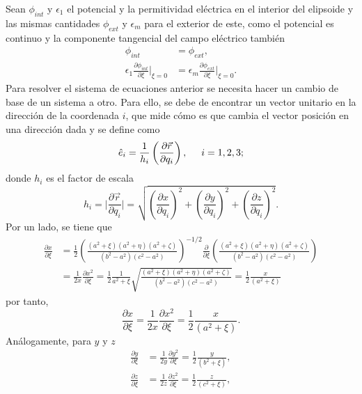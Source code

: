 \documentclass[paper=letter, fontsize=12pt,]{article}
\newcommand{\uvec}[1]{\hat{e}_{#1}}
\begin{document}
Sean $\phi_{int}$ y $\epsilon_1$ el potencial y la permitividad eléctrica en el interior del elipsoide y las mismas cantidades $\phi_{ext}$ y $\epsilon_m$ para el exterior de este, como el potencial es continuo y la componente tangencial del campo eléctrico también
\begin{subequations}
\label{condicionesfrontera}
\begin{align}
    \phi_{int}&=\phi_{ext}\label{cf1},\\
    \epsilon_1\frac{\partial \phi_{int}}{\partial \xi}\Big |_{\xi=0}&=
    \epsilon_m\frac{\partial \phi_{ext}}{\partial \xi}\Big |_{\xi=0}\label{cf2}.
\end{align}
\end{subequations}
Para resolver el sistema de ecuaciones anterior se necesita hacer un cambio de base de un sistema a otro. Para ello, se debe de encontrar un vector unitario en la dirección de la coordenada $i$, que mide cómo es que cambia el vector posición en una dirección dada y se define como \cite{Arfken}
\begin{equation}
    \uvec{i}=\frac{1}{h_i}\left(\frac{\partial \Vec{r}}{\partial q_i}\right), \hspace{0.5cm} i=1,2,3;    
\end{equation}
donde $h_i$ es el factor de escala
\begin{equation}
    h_i=\Big|\frac{\partial \Vec{r}}{\partial q_i}\Big|=\sqrt{\left(\frac{\partial x}{\partial q_i}\right)^2+\left(\frac{\partial y}{\partial q_i}\right)^2+\left(\frac{\partial z}{\partial q_i}\right)^2}.
\end{equation}
Por un lado, se tiene que 
\begin{align*}
  \frac{\partial x}{\partial \xi}&=\frac{1}{2}\left(\frac{(a^2+\xi)(a^2+\eta)(a^2+\zeta)}{(b^2-a^2)(c^2-a^2)}\right)^{-1/2}\frac{\partial}{\partial \xi}\left(\frac{(a^2+\xi)(a^2+\eta)(a^2+\zeta)}{(b^2-a^2)(c^2-a^2)}\right)\nonumber\\
  &=\frac{1}{2x}\frac{\partial x^2}{\partial\xi}=\frac{1}{2}\frac{1}{a^2+\xi}\sqrt{\frac{(a^2+\xi)(a^2+\eta)(a^2+\zeta)}{(b^2-a^2)(c^2-a^2)}}=\frac{1}{2}\frac{x}{(a^2+\xi)}
\end{align*}
por tanto,
\begin{equation}
    \frac{\partial x}{\partial \xi}=\frac{1}{2x}\frac{\partial x^2}{\partial\xi}=\frac{1}{2}\frac{x}{(a^2+\xi)}.
\end{equation}
Análogamente, para $y$ y $z$
\begin{align}
    \frac{\partial y}{\partial \xi}&=\frac{1}{2y}\frac{\partial y^2}{\partial\xi}=\frac{1}{2}\frac{y}{(b^2+\xi)},\\
    \frac{\partial z}{\partial \xi}&=\frac{1}{2z}\frac{\partial z^2}{\partial\xi}=\frac{1}{2}\frac{z}{(c^2+\xi)},
\end{align}
\end{document}
